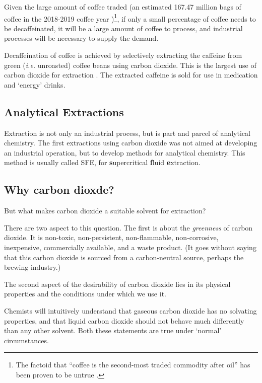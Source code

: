 Given the large amount of coffee traded (an estimated 167.47 million bags of
coffee in the 2018-2019 coffee year \autocite{Coffee2018})\footnote{The factoid
that ``coffee is the second-most traded commodity after oil'' has been proven to
be untrue \autocite{Greenberg2017}.}, if only a small percentage of coffee needs
to be decaffeinated, it will be a large amount of coffee to process, and
industrial processes will be necessary to supply the demand.

Decaffeination of coffee is achieved by selectively extracting the caffeine from
green (\textit{i.e.} unroasted) coffee beans using carbon dioxide. This is the
largest use of carbon dioxide for extraction \autocite{Ramalakshmi1999}. The
extracted caffeine is sold for use in medication and `energy' drinks. 

\subsection{Analytical Extractions}

Extraction is not only an industrial process, but is part and parcel of analytical
chemistry. The first extractions using carbon dioxide was not aimed at developing
an industrial operation, but to develop methods for analytical chemistry. This
method is usually called SFE, for \textbf{s}upercritical \textbf{f}luid
\textbf{e}xtraction.

\subsection{Why carbon dioxde?}

But what makes carbon dioxide a suitable solvent for extraction?

There are two aspect to this question. The first is about the \textit{greenness}
of carbon dioxide. It is non-toxic, non-persistent, non-flammable,
non-corrosive, inexpensive, commercially available, and a waste product. (It
goes without saying that this carbon dioxide is sourced from a carbon-neutral
source, perhaps the brewing industry.)

The second aspect of the desirability of carbon dioxide lies in its physical
properties and the conditions under which we use it. 

Chemists will intuitively understand that gaseous carbon dioxide has no solvating
properties, and that liquid carbon dioxide should not behave much differently
than any other solvent. Both these statements are true under `normal' circumstances.


